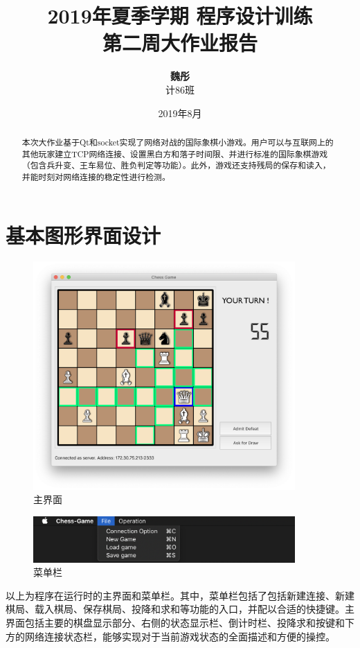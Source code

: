 \documentclass[12pt, a4paper]{article}
\title{\textbf{\LARGE 2019年夏季学期 \quad 程序设计训练 \\ 第二周大作业报告}}
\author{\textbf{魏彤} \\ 计86班 \quad 2018011417}
\date{2019年8月}
\begin{document}
	
	\maketitle
	
	\begin{abstract}
		本次大作业基于Qt和socket实现了网络对战的国际象棋小游戏。用户可以与互联网上的其他玩家建立TCP网络连接、设置黑白方和落子时间限、并进行标准的国际象棋游戏（包含兵升变、王车易位、胜负判定等功能）。此外，游戏还支持残局的保存和读入，并能时刻对网络连接的稳定性进行检测。
	\end{abstract}
	
	\section{基本图形界面设计}
		\begin{figure}[htbp]
			\centering
			\includegraphics[width=10cm]{Img/basicUI.png}
			\caption{主界面}
		\end{figure}
		\begin{figure}[htbp]
			\centering
			\includegraphics[width=10cm]{Img/menubar.png}
			\caption{菜单栏}
		\end{figure}
	
		以上为程序在运行时的主界面和菜单栏。其中，菜单栏包括了包括新建连接、新建棋局、载入棋局、保存棋局、投降和求和等功能的入口，并配以合适的快捷键。主界面包括主要的棋盘显示部分、右侧的状态显示栏、倒计时栏、投降求和按键和下方的网络连接状态栏，能够实现对于当前游戏状态的全面描述和方便的操控。
		
\end{document}
